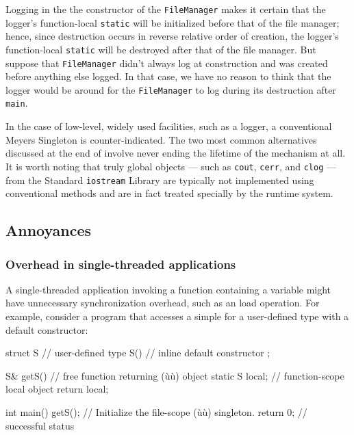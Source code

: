 Logging in the the constructor of the \lstinline!FileManager! 
makes it certain that the logger's function-local
\lstinline!static! will be initialized before that of the file manager;
hence, since destruction occurs in reverse relative order of creation,
the logger's function-local \lstinline!static! will be destroyed after that
of the file manager. But suppose that \lstinline!FileManager! didn't always
log at construction and was created before anything else logged. In that
case, we have no reason to think that the logger would be around for the
\lstinline!FileManager! to log during its destruction after \lstinline!main!.

In the case of low-level, widely used facilities, such as a logger, a
conventional Meyers Singleton is counter-indicated. The two most common
alternatives discussed at the end of  involve never ending the lifetime of
the mechanism at all. It is worth noting that truly global objects ---
such as \lstinline!cout!, \lstinline!cerr!, and \lstinline!clog! --- from the
Standard \lstinline!iostream! Library are typically not implemented using
conventional methods and are in fact treated specially by the runtime system.

\subsection[Annoyances]{Annoyances}\label{annoyances}

\subsubsection[Overhead in single-threaded applications]{Overhead in single-threaded applications}\label{overhead-in-single-threaded-applications}

A single-threaded application invoking a function containing a
  variable might
have unnecessary synchronization overhead, such as an 
load operation. For example, consider a program that accesses
a simple   for a user-defined type with a
 default constructor:

\begin{emcppslisting}
struct S  // user-defined type
{
    S() { }  // inline default constructor
};

S& getS()  // free function returning (ù{}ù) object
{
    static S local;  // function-scope local object
    return local;
}

int main()
{
    getS();    // Initialize the file-scope (ù{}ù) singleton.
    return 0;  // successful status
}
\end{emcppslisting}

